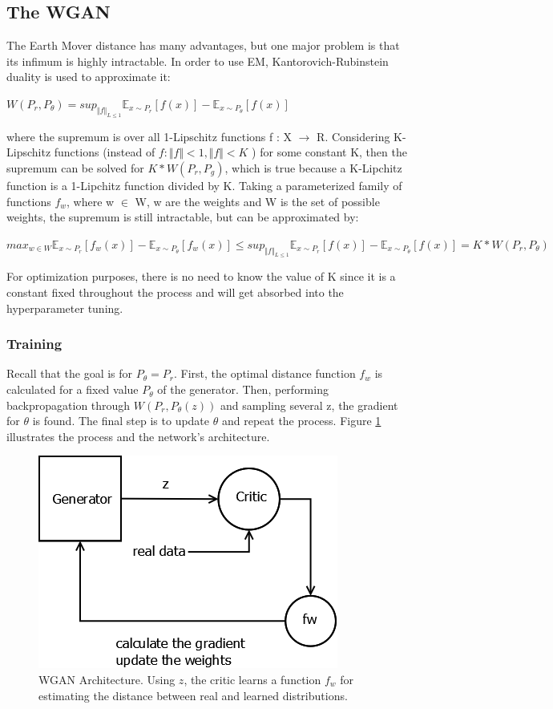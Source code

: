\subsection{The WGAN}
The Earth Mover distance has many advantages, but one major problem is that its infimum is highly intractable. In order to use EM, Kantorovich-Rubinstein duality is used to approximate it:
\begin{center}
	$W(P_{r},P_{\theta}) = sup_{\Vert f \Vert_{L \leq 1}} \mathbb{E}_{x \sim P_{r}}[f(x)] - \mathbb{E}_{x \sim P_{\theta}}[f(x)] $
\end{center}
where the supremum is over all 1-Lipschitz functions f : X $\rightarrow$ R. Considering K-Lipschitz functions (instead of $f : \Vert f \Vert < 1, \Vert f \Vert < K$ ) for some constant K, then the supremum can be solved  for $K*W(P_{r}, P_{g})$, which is true because a K-Lipchitz function is a 1-Lipchitz function divided by K. Taking a parameterized family of  functions $f_{w}$, where w $\in$ W, w are the weights and W is the set of possible weights,  the supremum is still intractable, but can be approximated by:

\begin{center}
	$ max_{w \in W} \mathbb{E}_{x \sim P_{r}}[f_{w}(x)] - \mathbb{E}_{x \sim P_{\theta}}[f_{w}(x)] \leq sup_{\Vert f \Vert_{L \leq 1}} \mathbb{E}_{x \sim P_{r}}[f(x)] - \mathbb{E}_{x \sim P_{\theta}}[f(x)] = K * W(P_{r}, P_{\theta}) $
\end{center}

For optimization purposes, there is no need to know the value of K since it is a constant fixed throughout the process and will get absorbed into the hyperparameter tuning.


\subsubsection {Training}

Recall that the goal is for $P_{\theta}=P_{r}$. First, the optimal distance function $f_{w}$ is calculated for a fixed value $P_{\theta}$ of the generator. Then,  performing  backpropagation through $W(P_{r}, P_{\theta}(z))$ and sampling several z, the gradient for $\theta$ is found. The final step is to update $\theta$ and repeat the process. Figure \ref{fig:wgan} illustrates the process and the network's architecture. 

\begin{figure}[h!]
	\centering
	\includegraphics[scale=0.4]{media/WGAN.png}
	\caption{WGAN Architecture. Using $z$, the critic learns a function $f_w$ for estimating the distance between real and learned distributions.} 
	\label{fig:wgan}
\end{figure}

